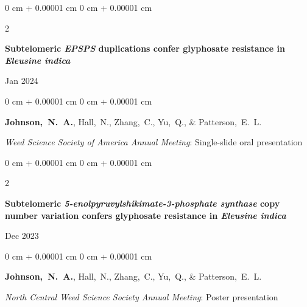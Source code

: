 \documentclass[10pt, letterpaper]{article}
\newenvironment{onecolentry}{
    \begin{adjustwidth}{
        0 cm + 0.00001 cm
    }{
        0 cm + 0.00001 cm
    }
}{
    \end{adjustwidth}
} %
\newenvironment{twocolentry}[2][]{
    \onecolentry
    \def\secondColumn{#2}
    \setcolumnwidth{\fill, 4.5 cm}
    \begin{paracol}{2}
}{
    \switchcolumn \raggedleft \secondColumn
    \end{paracol}
    \endonecolentry
} %
\begin{document}
        \begin{samepage}
            \begin{twocolentry}{
                Jan 2024
            }
                \textbf{Subtelomeric \textit{EPSPS} duplications confer glyphosate resistance in \textit{Eleusine indica}}
            \end{twocolentry}

            \vspace{0.10 cm}
            
            \begin{onecolentry}
                \mbox{\textbf{Johnson, N. A.}}, \mbox{Hall, N.}, \mbox{Zhang, C.}, \mbox{Yu, Q.}, \& \mbox{Patterson, E. L.}

                \vspace{0.10 cm}
                
                \textit{Weed Science Society of America Annual Meeting}: Single-slide oral presentation
            \end{onecolentry}
        \end{samepage}


        \vspace{0.2 cm}
        

        \begin{samepage}
            \begin{twocolentry}{
                Dec 2023
            }
                \textbf{Subtelomeric \textit{5-enolpyruvylshikimate-3-phosphate synthase} copy number variation confers glyphosate resistance in \textit{Eleusine indica}}
            \end{twocolentry}

            \vspace{0.10 cm}
            
            \begin{onecolentry}
                \mbox{\textbf{Johnson, N. A.}}, \mbox{Hall, N.}, \mbox{Zhang, C.}, \mbox{Yu, Q.}, \& \mbox{Patterson, E. L.}

                \vspace{0.10 cm}
                
                \textit{North Central Weed Science Society Annual Meeting}: Poster presentation
            \end{onecolentry}
        \end{samepage}


        \vspace{0.2 cm}
        
\end{document}
